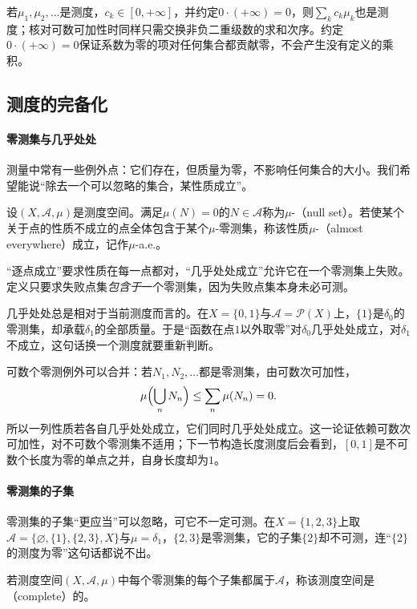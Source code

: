 若$\mu_1,\mu_2,\dots$是测度，$c_k\in[0,+\infty]$，并约定$0\cdot(+\infty)=0$，则$\sum_kc_k\mu_k$也是测度；核对可数可加性时同样只需交换非负二重级数的求和次序。约定$0\cdot(+\infty)=0$保证系数为零的项对任何集合都贡献零，不会产生没有定义的乘积。

\subsection{测度的完备化}
\label{sec:meas-completion}

\paragraph{零测集与几乎处处}
测量中常有一些例外点：它们存在，但质量为零，不影响任何集合的大小。我们希望能说“除去一个可以忽略的集合，某性质成立”。

\begin{definition}[零测集与几乎处处]
\label{def:meas-null-set}
设$(X,\mathcal A,\mu)$是测度空间。满足$\mu(N)=0$的$N\in\mathcal A$称为$\mu$-（null set）。若使某个关于点的性质不成立的点全体包含于某个$\mu$-零测集，称该性质$\mu$-（almost everywhere）成立，记作$\mu$-a.e.。
\end{definition}

“逐点成立”要求性质在每一点都对，“几乎处处成立”允许它在一个零测集上失败。定义只要求失败点集\emph{包含于}一个零测集，因为失败点集本身未必可测。

几乎处处总是相对于当前测度而言的。在$X=\{0,1\}$与$\mathcal A=\mathcal P(X)$上，$\{1\}$是$\delta_0$的零测集，却承载$\delta_1$的全部质量。于是“函数在点$1$以外取零”对$\delta_0$几乎处处成立，对$\delta_1$不成立，这句话换一个测度就要重新判断。

可数个零测例外可以合并：若$N_1,N_2,\dots$都是零测集，由可数次可加性，
\[
 \mu\Bigl(\bigcup_nN_n\Bigr)\leq\sum_n\mu(N_n)=0.
\]
所以一列性质若各自几乎处处成立，它们同时几乎处处成立。这一论证依赖可数次可加性，对不可数个零测集不适用；下一节构造长度测度后会看到，$[0,1]$是不可数个长度为零的单点之并，自身长度却为$1$。

\paragraph{零测集的子集}
零测集的子集“更应当”可以忽略，可它不一定可测。在$X=\{1,2,3\}$上取$\mathcal A=\{\varnothing,\{1\},\{2,3\},X\}$与$\mu=\delta_1$，$\{2,3\}$是零测集，它的子集$\{2\}$却不可测，连“$\{2\}$的测度为零”这句话都说不出。

\begin{definition}[完备测度空间]
\label{def:meas-complete}
若测度空间$(X,\mathcal A,\mu)$中每个零测集的每个子集都属于$\mathcal A$，称该测度空间是（complete）的。
\end{definition}

